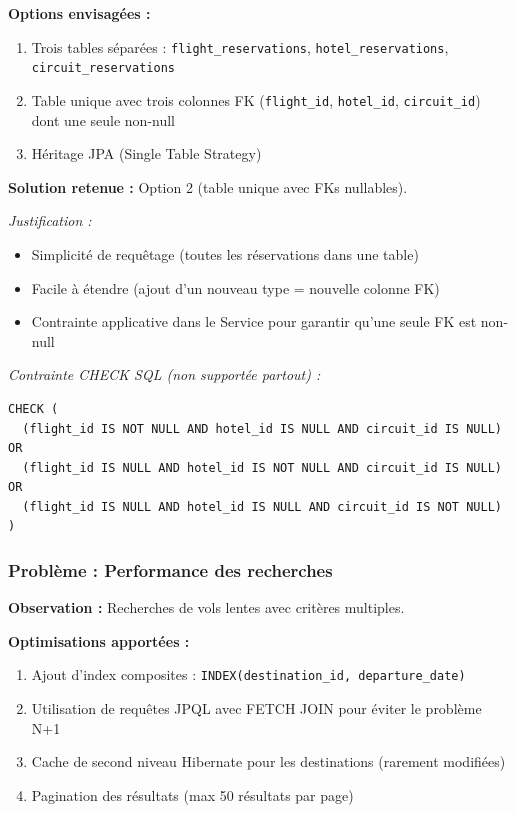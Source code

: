 \documentclass[12pt,a4paper]{report}
\begin{document}
\textbf{Options envisagées :}
\begin{enumerate}
    \item Trois tables séparées : \texttt{flight\_reservations}, \texttt{hotel\_reservations}, \texttt{circuit\_reservations}
    \item Table unique avec trois colonnes FK (\texttt{flight\_id}, \texttt{hotel\_id}, \texttt{circuit\_id}) dont une seule non-null
    \item Héritage JPA (Single Table Strategy)
\end{enumerate}

\textbf{Solution retenue :} Option 2 (table unique avec FKs nullables).

\textit{Justification :}
\begin{itemize}
    \item Simplicité de requêtage (toutes les réservations dans une table)
    \item Facile à étendre (ajout d'un nouveau type = nouvelle colonne FK)
    \item Contrainte applicative dans le Service pour garantir qu'une seule FK est non-null
\end{itemize}

\textit{Contrainte CHECK SQL (non supportée partout) :}
\begin{verbatim}
CHECK (
  (flight_id IS NOT NULL AND hotel_id IS NULL AND circuit_id IS NULL) OR
  (flight_id IS NULL AND hotel_id IS NOT NULL AND circuit_id IS NULL) OR
  (flight_id IS NULL AND hotel_id IS NULL AND circuit_id IS NOT NULL)
)
\end{verbatim}

\subsubsection{Problème : Performance des recherches}

\textbf{Observation :} Recherches de vols lentes avec critères multiples.

\textbf{Optimisations apportées :}
\begin{enumerate}
    \item Ajout d'index composites : \texttt{INDEX(destination\_id, departure\_date)}
    \item Utilisation de requêtes JPQL avec FETCH JOIN pour éviter le problème N+1
    \item Cache de second niveau Hibernate pour les destinations (rarement modifiées)
    \item Pagination des résultats (max 50 résultats par page)
\end{enumerate}
\end{document}
